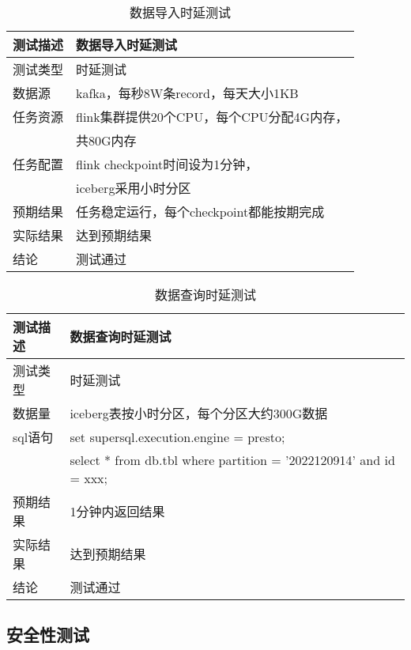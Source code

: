 \begin{table}[H]
  \centering
  \caption{数据导入时延测试}
  \label{tab:数据导入}
  \begin{tabular}{ll}
    \toprule
    测试描述         & 数据导入时延测试         \\
    \midrule
    测试类型         & 时延测试         \\
    数据源           & kafka，每秒8W条record，每天大小1KB     \\
    任务资源         & flink集群提供20个CPU，每个CPU分配4G内存， \\
                   &  共80G内存     \\
    任务配置         & flink checkpoint时间设为1分钟，  \\
                    &  iceberg采用小时分区      \\
    预期结果         & 任务稳定运行，每个checkpoint都能按期完成  \\
    实际结果         & 达到预期结果           \\
    结论            & 测试通过           \\
    \bottomrule
  \end{tabular}
\end{table}

\begin{table}[H]
  \centering
  \caption{数据查询时延测试}
  \label{tab:数据查询}
  \begin{tabular}{ll}
    \toprule
    测试描述         & 数据查询时延测试         \\
    \midrule
    测试类型         & 时延测试         \\
    数据量          & iceberg表按小时分区，每个分区大约300G数据  \\
    sql语句         & set supersql.execution.engine = presto;    \\
                   & select * from db.tbl where partition = '2022120914' and id = xxx;       \\
    预期结果         & 1分钟内返回结果  \\
    实际结果         & 达到预期结果           \\
    结论            & 测试通过           \\
    \bottomrule
  \end{tabular}
\end{table}

\subsection{安全性测试}

